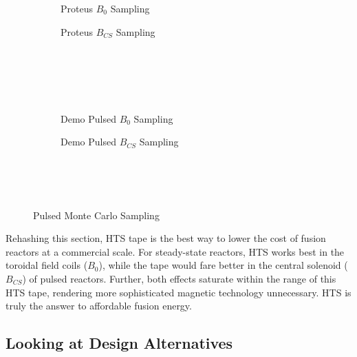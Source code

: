 \begin{figure*}
    \centering
    \hfill 
    \begin{subfigure}[t]{0.45\textwidth}
        \centering
		\begin{adjustbox}{width=\textwidth}
			\Large
			
		\end{adjustbox}
        \caption{Proteus $B_0$ Sampling}
    \end{subfigure}
    \hfill
    \begin{subfigure}[t]{0.45\textwidth}
        \centering
		\begin{adjustbox}{width=\textwidth}
			\Large
			
		\end{adjustbox}
        \caption{Proteus $B_{CS}$ Sampling}
    \end{subfigure}
    \hfill \hfill ~\\ ~\\ ~\\ ~\\
    \hfill 
    \begin{subfigure}[t]{0.45\textwidth}
        \centering
		\begin{adjustbox}{width=\textwidth}
			\Large
			
		\end{adjustbox}
        \caption{Demo Pulsed $B_0$ Sampling}
    \end{subfigure}
    \hfill
    \begin{subfigure}[t]{0.45\textwidth}
        \centering
		\begin{adjustbox}{width=\textwidth}
			\Large
			
		\end{adjustbox}
        \caption{Demo Pulsed $B_{CS}$ Sampling}
    \end{subfigure}	
    \hfill \hfill ~\\ ~\\ ~\\
    \caption{Pulsed Monte Carlo Sampling}
    \label{fig:pulsed_samplings}
\end{figure*}

Rehashing this section, HTS tape is the best way to lower the cost of fusion reactors at a commercial scale. For steady-state reactors, HTS works best in the toroidal field coils ($B_0$), while the tape would fare better in the central solenoid ($B_{CS}$) of pulsed reactors. Further, both effects saturate within the range of this HTS tape, rendering more sophisticated magnetic technology unnecessary. HTS is truly the answer to affordable fusion energy.

\subsection{Looking at Design Alternatives}



%
